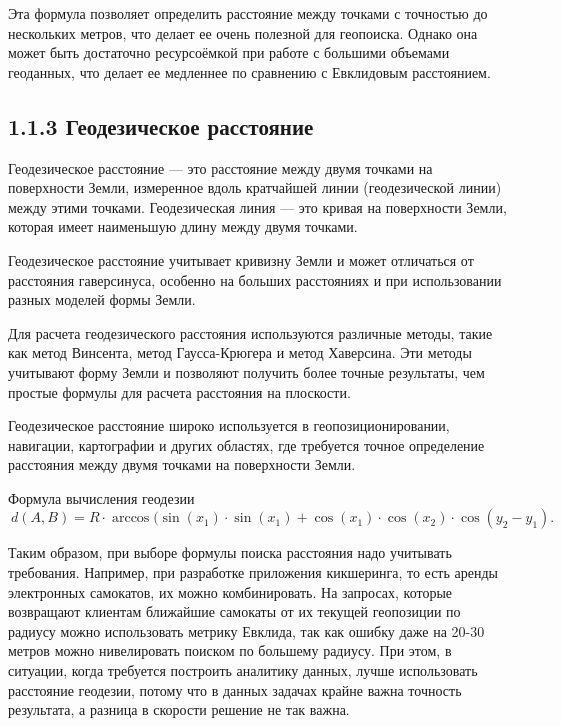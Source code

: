 Эта формула позволяет определить расстояние между точками с точностью до нескольких метров, что делает ее очень полезной для геопоиска. Однако она может быть достаточно ресурсоёмкой при работе с большими объемами геоданных, что делает ее медленнее по сравнению с Евклидовым расстоянием. 

\subsection{1.1.3 Геодезическое расстояние}
Геодезическое расстояние — это расстояние между двумя точками на поверхности Земли, измеренное вдоль кратчайшей линии (геодезической линии) между этими точками. Геодезическая линия — это кривая на поверхности Земли, которая имеет наименьшую длину между двумя точками.

Геодезическое расстояние учитывает кривизну Земли и может отличаться от расстояния гаверсинуса, особенно на больших расстояниях и при использовании разных моделей формы Земли.

Для расчета геодезического расстояния используются различные методы, такие как метод Винсента, метод Гаусса-Крюгера и метод Хаверсина. Эти методы учитывают форму Земли и позволяют получить более точные результаты, чем простые формулы для расчета расстояния на плоскости.
    
Геодезическое расстояние широко используется в геопозиционировании, навигации, картографии и других областях, где требуется точное определение расстояния между двумя точками на поверхности Земли.

Формула вычисления геодезии
\begin{equation} \label{eq}
\ d(A, B) = R \cdot \arccos(\sin(x_1) \cdot \sin(x_1) + \cos(x_1) \cdot \cos(x_2) \cdot \cos(y_2 - y_1).
\end{equation}
\par
Таким образом, при выборе формулы поиска расстояния надо учитывать требования. Например, при разработке приложения кикшеринга, то есть аренды электронных самокатов, их можно комбинировать. На запросах, которые возвращают клиентам ближайшие самокаты от их текущей геопозиции по радиусу можно использовать метрику Евклида, так как ошибку даже на 20-30 метров можно нивелировать поиском по большему радиусу.  
При этом, в ситуации, когда требуется построить аналитику данных, лучше использовать расстояние геодезии, потому что в данных задачах крайне важна точность результата, а разница в скорости решение не так важна. 

